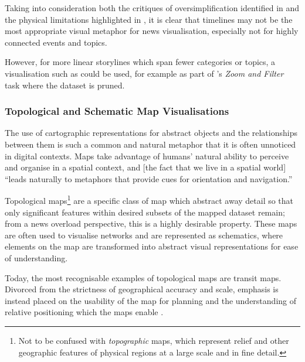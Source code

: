 Taking into consideration both the critiques of  oversimplification identified in \citep{SchemaLine} and the physical limitations highlighted in \citep{TimeSets, ThemeRiver}, it is clear that timelines may not be the most appropriate visual metaphor for news visualisation, especially not for highly connected events and topics. 

However, for more linear storylines which span fewer categories or topics, a visualisation such as \citep{SchemaLine} could be used, for example as part of \citeauthor{TheEyesHaveIt}'s \textit{Zoom and Filter} task where the dataset is pruned.

\subsubsection{Topological and Schematic Map Visualisations}

The use of cartographic representations for abstract objects and the relationships between them is such a common and natural metaphor that it is often unnoticed in digital contexts. Maps take advantage of humans' natural ability to perceive and organise in a spatial context, and [the fact that we live in a spatial world] ``leads naturally to metaphors that provide cues for orientation and navigation.'' \citep[p.2]{InformationCartographyUsingGIS}

Topological maps\footnote{Not to be confused with \textit{topographic} maps, which represent relief and other geographic features of physical regions at a large scale and in fine detail.} are a specific class of map which abstract away detail so that only significant features within desired subsets of the mapped dataset remain; from a news overload perspective, this is a highly desirable property. These maps are often used to visualise networks and are represented as schematics, where elements on the map are transformed into abstract visual representations for ease of understanding.

Today, the most recognisable examples of topological maps are transit maps. Divorced from the strictness of geographical accuracy and scale, emphasis is instead placed on the usability of the map for planning and the understanding of relative positioning which the maps enable \citep{TheInfluenceOfMapDesignOnRouteChoice}.

